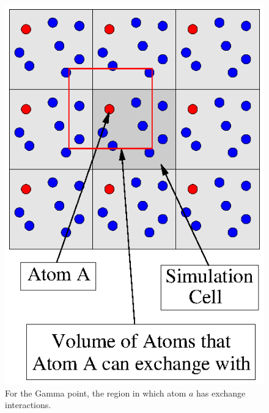 \documentclass[prb,aps,nobibnotes,twocolumn,doublespace,twocolumngrid,superbib]{revtex4}
\begin{document}
%
%
%
\begin{figure}
\caption{For the Gamma point, the region in which atom $a$ has exchange interactions.}
\label{figure:ExchangeRegion}
{\centering \includegraphics{ExchangeRegion.ps} \par}
\end{figure}
%
%
%
\end{document}
